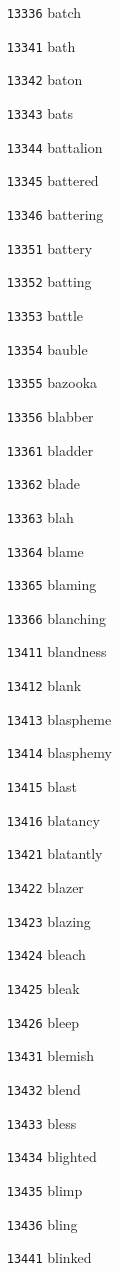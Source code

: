 \documentclass[twoside,11pt]{article}
\begin{document}
\begin{multicols}{5}
\begin{enumerate}
\item[\texttt{13336}] batch
\item[\texttt{13341}] bath
\item[\texttt{13342}] baton
\item[\texttt{13343}] bats
\item[\texttt{13344}] battalion
\item[\texttt{13345}] battered
\item[\texttt{13346}] battering
\item[\texttt{13351}] battery
\item[\texttt{13352}] batting
\item[\texttt{13353}] battle
\item[\texttt{13354}] bauble
\item[\texttt{13355}] bazooka
\item[\texttt{13356}] blabber
\item[\texttt{13361}] bladder
\item[\texttt{13362}] blade
\item[\texttt{13363}] blah
\item[\texttt{13364}] blame
\item[\texttt{13365}] blaming
\item[\texttt{13366}] blanching
\item[\texttt{13411}] blandness
\item[\texttt{13412}] blank
\item[\texttt{13413}] blaspheme
\item[\texttt{13414}] blasphemy
\item[\texttt{13415}] blast
\item[\texttt{13416}] blatancy
\item[\texttt{13421}] blatantly
\item[\texttt{13422}] blazer
\item[\texttt{13423}] blazing
\item[\texttt{13424}] bleach
\item[\texttt{13425}] bleak
\item[\texttt{13426}] bleep
\item[\texttt{13431}] blemish
\item[\texttt{13432}] blend
\item[\texttt{13433}] bless
\item[\texttt{13434}] blighted
\item[\texttt{13435}] blimp
\item[\texttt{13436}] bling
\item[\texttt{13441}] blinked

\end{enumerate}
\end{multicols}
\end{document}
